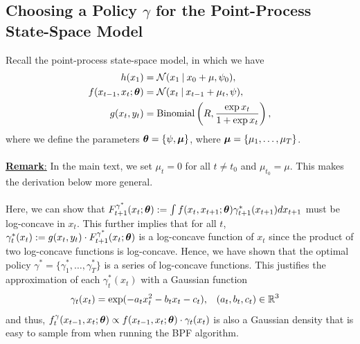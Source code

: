 \documentclass{article}
\begin{document}
\subsection{Choosing a Policy $\gamma$ for the Point-Process State-Space Model}  
Recall the point-process state-space model, in which we have
\begin{align*} 
h(x_1) &= \mathcal{N}(x_1 \:\vert\: x_0 + \mu, \psi_0), \\
f(x_{t-1}, x_t ; \boldsymbol{\theta}) &= \mathcal{N}(x_t \:\vert\: x_{t-1} + \mu_t , \psi),  \\
g(x_t, y_t) &= \text{Binomial}\left(R, \frac{\exp x_t}{1 + \exp x_t}\right),
\end{align*} 
where we define the parameters $\boldsymbol{\theta} = \{\psi, \boldsymbol{\mu}\}$, where $\boldsymbol{\mu} = \{\mu_1, \ldots, \mu_T\}$.  
\\
\\
\noindent \underline{\textbf{Remark}:} In the main text, we set $\mu_t = 0$ for all $t \neq t_0$ and $\mu_{t_0} = \mu$. This makes the derivation below more general.
\\
\\
Here, we can show that $F^{\gamma^*}_{t+1}(x_t; \boldsymbol{\theta}) := \int f(x_{t}, x_{t+1}; \boldsymbol{\theta})\gamma^*_{t+1}(x_{t+1}) dx_{t+1}$ must be log-concave in $x_{t}$.  This further implies that for all $t$, $\gamma^*_t(x_t) := g(x_t, y_t) \cdot F^{\gamma^*}_{t+1}(x_t; \boldsymbol{\theta})$ is a log-concave function of $x_t$ since the product of two log-concave functions is log-concave.  Hence, we have shown that the optimal policy $\gamma^* = \{\gamma^*_1, \ldots, \gamma^*_T\}$ is a series of log-concave functions.  This justifies the approximation of each $\gamma^*_t(x_t)$ with a Gaussian function 
\begin{align*}
\gamma_t(x_t) = \exp(-a_t x_t^2 - b_t x_t - c_t), & \quad (a_t, b_t, c_t) \in \mathbb{R}^3
\end{align*}
and thus, $f_t^{\gamma}(x_{t-1}, x_t; \boldsymbol{\theta}) \propto f(x_{t-1}, x_t; \boldsymbol{\theta}) \cdot \gamma_t(x_t)$ is also a Gaussian density that is easy to sample from when running the BPF algorithm.
\end{document}

